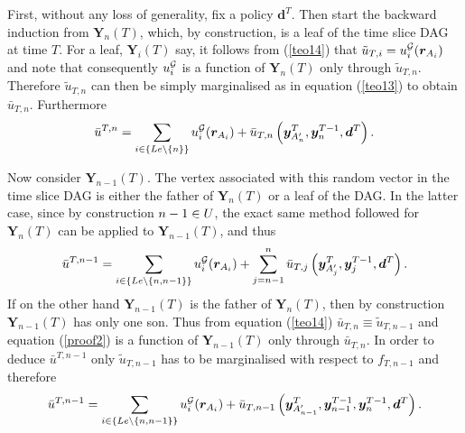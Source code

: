 First, without any loss of generality, fix a policy $\bm{d}^T$. Then start the backward induction from $\bm{Y}_n(T)$, which, by construction, is a leaf of the time slice DAG at time $T$. For a leaf, $\bm{Y}_i(T)$ say,  it follows from (\ref{teo14}) that $\tilde{u}_{T,i}=u^{\mathcal{G}}_i(\bm{r}_{A_i})$ and note that consequently $u^{\mathcal{G}}_i$ is a function of $\bm{Y}_n(T)$ only through $\tilde{u}_{T,n}$. Therefore $\tilde{u}_{T,n}$ can then be simply marginalised as in equation (\ref{teo13}) to obtain $\bar{u}_{T,n}$. Furthermore
\begin{equation}
\bar{u}^{T,n}=\sum_{i\in \{Le\setminus \{n\}\}}u^{\Gr}_i(\bm{r}_{A_i})+\bar{u}_{T,n}\left(\bm{y}^T_{A'_n},\bm{y}^{T-1}_n,\bm{d}^T\right).
\label{proof2}
\end{equation}

Now consider $\bm{Y}_{n-1}(T)$. The vertex associated with this random vector in the time slice DAG is either the father of $\bm{Y}_{n}(T)$ or a leaf of the DAG. In the latter case, since by construction $n-1\in U$, the exact same method followed for $\bm{Y}_n(T)$ can be applied to $\bm{Y}_{n-1}(T)$, and thus
\begin{equation}
\label{proof3}
\bar{u}^{T,n-1}=\sum_{i\in \{Le\setminus \{n,n{-1}\}\}}u^{\Gr}_i(\bm{r}_{A_i})+\sum_{j=n-1}^n\bar{u}_{T,j}\left(\bm{y}^T_{A'_j},\bm{y}^{T-1}_j,\bm{d}^T\right).
\end{equation}
If on the other hand $\bm{Y}_{n-1}(T)$ is the father of $\bm{Y}_n(T)$, then by construction $\bm{Y}_{n-1}(T)$ has only one son. Thus from equation (\ref{teo14}) $\bar{u}_{T,n}\equiv \tilde{u}_{T,n-1}$ and equation (\ref{proof2}) is a function of $\bm{Y}_{n-1}(T)$ only through $\bar{u}_{T,n}$. In order to deduce $\bar{u}^{T,n-1}$ only $\tilde{u}_{T,n-1}$ has to be marginalised with respect to $f_{T,n-1}$ and therefore 
\begin{equation}
\label{proof4}
\bar{u}^{T,n-1}=\sum_{i\in \{Le\setminus \{n,n{-1}\}\}}u^{\Gr}_i(\bm{r}_{A_i})+\bar{u}_{T,n-1}\left(\bm{y}^T_{A'_{n-1}},\bm{y}^{T-1}_{n-1},\bm{y}^{T-1}_n,\bm{d}^T\right).
\end{equation}

